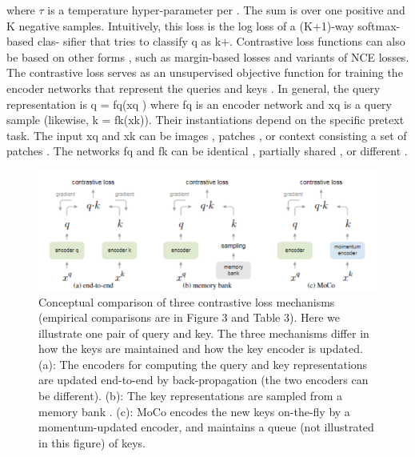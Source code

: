 \documentclass[10pt,twocolumn]{article}  %
\begin{document}
where $\tau$ is a temperature hyper-parameter per \cite{61_wu2018unsupervised}. The sum
is over one positive and K negative samples. Intuitively,
this loss is the log loss of a (K+1)-way softmax-based clas-
siﬁer that tries to classify q as k+. Contrastive loss functions
can also be based on other forms \cite{29_hadsell2006dimensionality, 59_wang2015unsupervised, 61_wu2018unsupervised, 36_hjelm2019learning}, such as
margin-based losses and variants of NCE losses.
The contrastive loss serves as an unsupervised objective
function for training the encoder networks that represent the
queries and keys \cite{29_hadsell2006dimensionality}. In general, the query representation
is q = fq(xq ) where fq is an encoder network and xq is a
query sample (likewise, k = fk(xk)). Their instantiations
depend on the speciﬁc pretext task. The input xq and xk can
be images \cite{29_hadsell2006dimensionality, 61_wu2018unsupervised, 63_he2019momentum}, patches \cite{46_oord2018representation}, or context consisting a
set of patches \cite{46_oord2018representation}. The networks fq and fk can be identical
\cite{29_hadsell2006dimensionality, 59_wang2015unsupervised, 63_he2019momentum}, partially shared \cite{46_oord2018representation, 36_hjelm2019learning, 2_bachman2019learning}, or different \cite{56_tian2019contrastive}.

\begin{figure}[htbp]
    \centering
    \includegraphics[width=0.8\linewidth]{Pic/figure2.png} %
    \caption{Conceptual comparison of three contrastive loss mechanisms (empirical comparisons are in Figure 3 and Table 3). Here we
    illustrate one pair of query and key. The three mechanisms differ in how the keys are maintained and how the key encoder is updated.
    (a): The encoders for computing the query and key representations are updated end-to-end by back-propagation (the two encoders can
    be different). (b): The key representations are sampled from a memory bank \cite{61_wu2018unsupervised}. (c): MoCo encodes the new keys on-the-ﬂy by a
    momentum-updated encoder, and maintains a queue (not illustrated in this ﬁgure) of keys.} %
    \label{fig:Figure 2} %
\end{figure}
\end{document}
